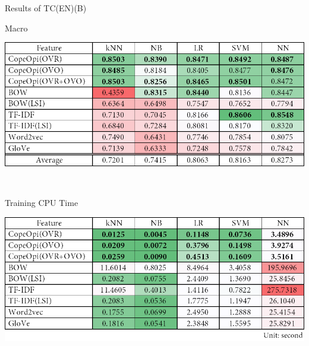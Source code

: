 \begin{table}[H]
\caption{Results of TC(EN)(B)}
\label{tab:tc_en_b}
\centering
\begin{subtable}{\textwidth}
	\centering
	\caption{Macro \fscore{}}
	\includegraphics[width=\resultfigwidth]{chapters/ch4/table/tc/TC(EN)(B).png}
\end{subtable}
\\[\tblskip]
\begin{subtable}{\textwidth}
	\centering
	\caption{Training CPU Time}
	\includegraphics[width=\resultfigwidth]{chapters/ch4/table/tc/TC(EN)(B)T.png}
\end{subtable}
\end{table}
